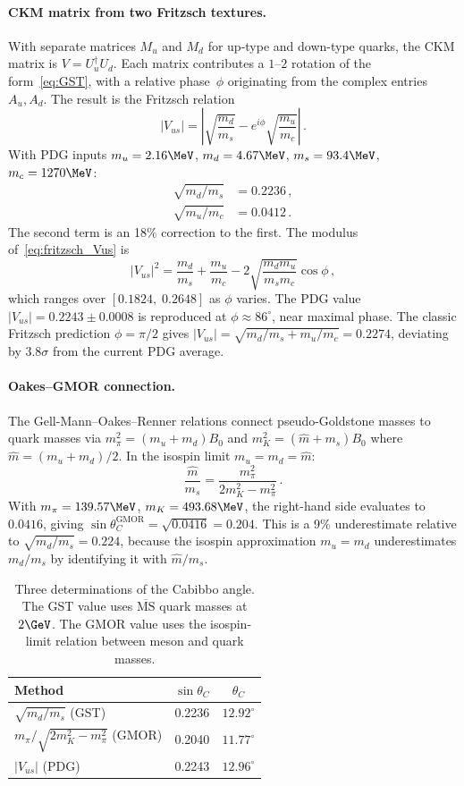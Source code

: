 \paragraph{CKM matrix from two Fritzsch textures.}
With separate matrices $M_u$ and $M_d$ for up-type and
down-type quarks, the CKM matrix is $V = U_u^\dagger U_d$.
Each matrix contributes a $1$--$2$ rotation of the form~\eqref{eq:GST},
with a relative phase~$\phi$ originating from the complex entries
$A_u, A_d$.  The result is the Fritzsch relation
\begin{equation}\label{eq:fritzsch_Vus}
|V_{us}| = \left|\sqrt{\frac{m_d}{m_s}}
  - e^{i\phi}\sqrt{\frac{m_u}{m_c}}\right|\,.
\end{equation}
With PDG inputs $m_u = 2.16\MeV$, $m_d = 4.67\MeV$,
$m_s = 93.4\MeV$, $m_c = 1270\MeV$:
\begin{align*}
\sqrt{m_d/m_s} &= 0.2236\,, \\
\sqrt{m_u/m_c} &= 0.0412\,.
\end{align*}
The second term is an 18\% correction to the first.
The modulus of~\eqref{eq:fritzsch_Vus} is
$$
|V_{us}|^2 = \frac{m_d}{m_s} + \frac{m_u}{m_c}
  - 2\sqrt{\frac{m_d m_u}{m_s m_c}}\cos\phi\,,
$$
which ranges over $[0.1824,\; 0.2648]$ as $\phi$ varies.
The PDG value $|V_{us}| = 0.2243 \pm 0.0008$ is reproduced at
$\phi \approx 86^\circ$, near maximal phase.  The classic
Fritzsch prediction $\phi = \pi/2$ gives
$|V_{us}| = \sqrt{m_d/m_s + m_u/m_c} = 0.2274$, deviating
by $3.8\sigma$ from the current PDG average.

\paragraph{Oakes--GMOR connection.}
The Gell-Mann--Oakes--Renner relations connect pseudo-Goldstone
masses to quark masses via $m_\pi^2 = (m_u + m_d)B_0$ and
$m_K^2 = (\hat m + m_s)B_0$ where $\hat m = (m_u + m_d)/2$.
In the isospin limit $m_u = m_d = \hat m$:
$$
\frac{\hat m}{m_s}
= \frac{m_\pi^2}{2m_K^2 - m_\pi^2}\,.
$$
With $m_\pi = 139.57\MeV$, $m_K = 493.68\MeV$, the right-hand
side evaluates to $0.0416$, giving
$\sin\theta_C^{\text{GMOR}} = \sqrt{0.0416} = 0.204$.
This is a 9\% underestimate relative to $\sqrt{m_d/m_s} = 0.224$,
because the isospin approximation $m_u = m_d$ underestimates
$m_d/m_s$ by identifying it with $\hat m/m_s$.

\begin{table}[h]
\centering
\begin{tabular}{lcc}
\toprule
Method & $\sin\theta_C$ & $\theta_C$ \\
\midrule
$\sqrt{m_d/m_s}$ (GST) & 0.2236 & $12.92^\circ$ \\
$m_\pi/\sqrt{2m_K^2-m_\pi^2}$ (GMOR) & 0.2040 & $11.77^\circ$ \\
$|V_{us}|$ (PDG) & 0.2243 & $12.96^\circ$ \\
\bottomrule
\end{tabular}
\caption{Three determinations of the Cabibbo angle.  The GST
value uses $\overline{\text{MS}}$ quark masses at $2\GeV$.
The GMOR value uses the isospin-limit relation between meson
and quark masses.}
\end{table}

